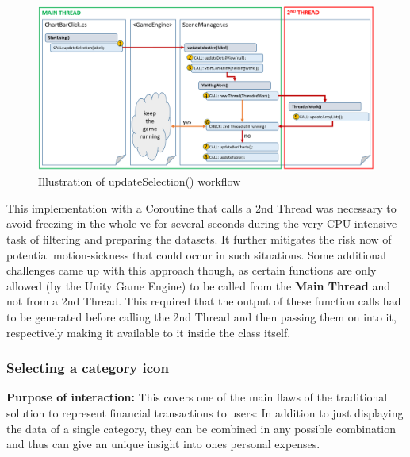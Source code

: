 \begin{figure}[h]
	\begin{center}
		\includegraphics[width=14cm]{03_Figures/08_Development/UpdateSelection.png}
		\caption{Illustration of updateSelection() workflow}
		\label{fig:unityupdateselection}
	\end{center}
\end{figure}
This implementation with a Coroutine that calls a 2nd Thread was necessary to avoid freezing in the whole \gls{ve} for several seconds during the very CPU intensive task of filtering and preparing the datasets. It further mitigates the risk now of potential motion-sickness that could occur in such situations. \newline
Some additional challenges came up with this approach though, as certain functions are only allowed (by the Unity Game Engine) to be called from the \textbf{Main Thread} and not from a 2nd Thread. This required that the output of these function calls had to be generated before calling the 2nd Thread and then passing them on into it, respectively making it available to it inside the class itself.


\subsubsection{Selecting a category icon}

\textbf{Purpose of interaction:} This covers one of the main flaws of the traditional solution to represent financial transactions to users: In addition to just displaying the data of a single category, they can be combined in any possible combination  and thus can give an unique insight into ones personal expenses. 

